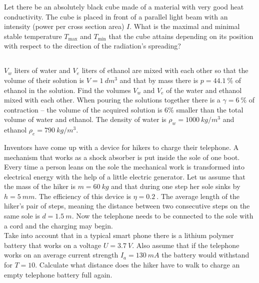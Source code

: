 \documentclass[11pt]{article}
\begin{document}

\probeng
Let there be an absolutely black cube made of a material with very good heat conductivity. The cube is placed in front of a parallel light beam with an intensity (power per cross section area) $I$. What is the maximal and minimal stable temperature $T_\text{max}$ and $T_\text{min}$ that the cube attains depending on its position with respect to the direction of the radiation’s spreading?
\probend
\bigskip
\newpage\subsection{\protect{}}


\probeng
$V_w$ liters of water and $V_e$ liters of ethanol are mixed with each other so that the volume of their solution is $V=\SI{1}{dm^3}$ and that by mass there is $p=\SI{44,1}{\percent}$ of ethanol in the solution. Find the volumes $V_w$ and $V_e$ of the water and ethanol mixed with each other. When pouring the solutions together there is a $\gamma = \SI{6}{\percent}$ of contraction – the volume of the acquired solution is 6\% smaller than the total volume of water and ethanol. The density of water is $\rho_w=\SI{1000}{kg/m^3}$ and ethanol $\rho_e=\SI{790}{kg/m^3}$.
\probend
\bigskip


\probeng
Inventors have come up with a device for hikers to charge their telephone. A mechanism that works as a shock absorber is put inside the sole of one boot. Every time a person leans on the sole the mechanical work is transformed into electrical energy with the help of a little electric generator. Let us assume that the mass of the hiker is $m=\SI{60}{kg}$ and that during one step her sole sinks by $h=\SI{5}{mm}$. The efficiency of this device is $\eta = \SI{0,2}{}$. The average length of the hiker’s pair of steps, meaning the distance between two consecutive steps on the same sole is $d=\SI{1.5}{m}$. Now the telephone needs to be connected to the sole with a cord and the charging may begin.\\
Take into account that in a typical smart phone there is a lithium polymer battery that works on a voltage $U=\SI{3.7}{V}$. Also assume that if the telephone works on an average current strength $I_a=\SI{130}{mA}$ the battery would withstand for $T=10$. Calculate what distance does the hiker have to walk to charge an empty telephone battery full again.
\probend
\bigskip
\end{document}
